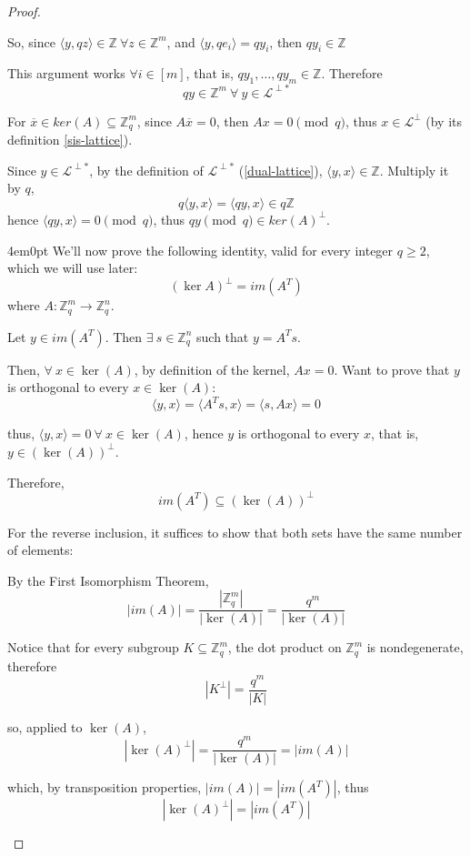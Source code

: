 \documentclass{article}
\theoremstyle{definition}
\newcommand{\Zz}{\mathbb{Z}}
\newcommand{\Ll}{\mathcal{L}}
\begin{document}
\begin{proof}
\begin{enumerate}[i.]
    So, since $\langle y, qz \rangle \in \Zz ~\forall z \in \Zz^m$, and $\langle y, q e_i \rangle = q y_i$, then $q y_i \in \Zz$

    This argument works $\forall i \in [m]$, that is, $q y_1, \ldots, q y_m \in \Zz$. Therefore
    $$qy \in \Zz^m ~\forall~ y \in \Ll^{\perp *}$$

    For $\overline{x} \in ker(A) \subseteq \Zz_q^m$, since $A \overline{x}=0$, then $Ax =0 \pmod q$, thus $x \in \Ll^\perp$ (by its definition \ref{sis-lattice}).

    Since $y \in \Ll^{\perp *}$, by the definition of $\Ll^{\perp *}$ (\ref{dual-lattice}), $\langle y, x \rangle \in \Zz$. Multiply it by $q$,
    $$ q \langle y, x \rangle = \langle qy, x \rangle \in q \Zz$$
    hence $\langle qy, x \rangle = 0 \pmod q$, thus $qy \pmod q \in ker(A)^\perp$.

    \begin{adjustwidth}{4em}{0pt}
      We'll now prove the following identity, valid for every integer $q\geq 2$, which we will use later:
      $$(\ker A)^\perp=im(A^T)$$
      where $A:\Zz_q^m \to \Zz_q^n$.

      Let $y \in im(A^T)$. Then $\exists~ s \in \Zz_q^n$ such that $y=A^Ts$.

      Then, $\forall~ x \in \ker(A)$, by definition of the kernel, $Ax=0$. Want to prove that $y$ is orthogonal to every $x \in \ker(A)$:
      $$\langle y,x\rangle = \langle A^Ts,x\rangle = \langle s,Ax\rangle = 0$$

      thus, $\langle y,x\rangle =0 ~\forall~ x \in \ker(A)$, hence $y$ is orthogonal to every $x$, that is, $y \in (\ker(A))^\perp$.

      Therefore,
      $$im(A^T) \subseteq (\ker(A))^\perp$$

      For the reverse inclusion, it suffices to show that both sets have the same number of elements:

      By the First Isomorphism Theorem,
      $$|im(A)| = \frac{ |\Zz_q^m|}{|\ker(A)|} = \frac{q^m}{|\ker(A)|}$$

      Notice that for every subgroup $K \subseteq \Zz_q^m$, the dot product on $\Zz_q^m$ is nondegenerate, therefore
      $$|K^\perp| = \frac{q^m}{|K|}$$

      so, applied to $\ker(A)$,
      $$|\ker(A)^\perp| = \frac{q^m}{|\ker(A)|}= |im(A)|$$

      which, by transposition properties, $|im(A)|=|im(A^T)|$, thus
      $$|\ker(A)^\perp| = |im(A^T)|$$


\end{adjustwidth}
\end{enumerate}
\end{proof}
\end{document}
